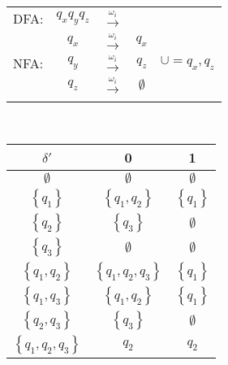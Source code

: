 \documentclass[
	final,
	a4paper,
	oneside,
	parskip=full,
	headings=standardclasses,
	headings=big,
	pointednumbers
]{scrartcl}
\begin{document}
	\begin{minipage}{0.6\textwidth}
        
        \begin{tabular}{l|ccc|l}
                \multicolumn{1}{c}{DFA:} & $q_xq_yq_z$ & $\xrightarrow{\omega_i}$ & \multicolumn{1}{c}{} & 
            \\  
                \cline{2-4}
                \multirow{3}{*}{NFA:}    & $q_x$ & $\xrightarrow{\omega_i}$ & $q_x$ & \multirow{3}{*}{$\cup = q_x,q_z$} 
            \\
                                         & $q_y$ & $\xrightarrow{\omega_i}$ & $q_z$ &
            \\
                                         & $q_z$ & $\xrightarrow{\omega_i}$ & $\emptyset$ &
            \\
                \cline{2-4}
                \multicolumn{1}{c}{} & & & \multicolumn{1}{c}{} &
            \\
        \end{tabular} \\
        \begin{tabular}{c|cc}
            $ \delta' $                          & 0                                 & 1                         \\
            \hline
            $ \emptyset $                       & $\emptyset$                       & $\emptyset$               \\
            $ \left\{ q_1 \right\} $            & $\left\{ q_1, q_2 \right\}$       & $\left\{ q_1 \right\}$    \\
            $ \left\{ q_2 \right\} $            & $ \left\{ q_3 \right\}$           & $\emptyset$               \\
            $ \left\{ q_3 \right\} $            & $\emptyset$                       & $\emptyset$               \\
            $ \left\{ q_1, q_2 \right\} $       & $\left\{ q_1, q_2, q_3 \right\}$  & $\left\{ q_1 \right\}$    \\
            $ \left\{ q_1, q_3 \right\} $       & $\left\{ q_1, q_2 \right\}$       & $\left\{ q_1 \right\}$    \\
            $ \left\{ q_2, q_3 \right\} $       & $\left\{ q_3 \right\}$            & $\emptyset$               \\
            $ \left\{ q_1, q_2, q_3 \right\} $  & $q_2$ & $q_2$
        \end{tabular}
	\end{minipage}
\end{document}
